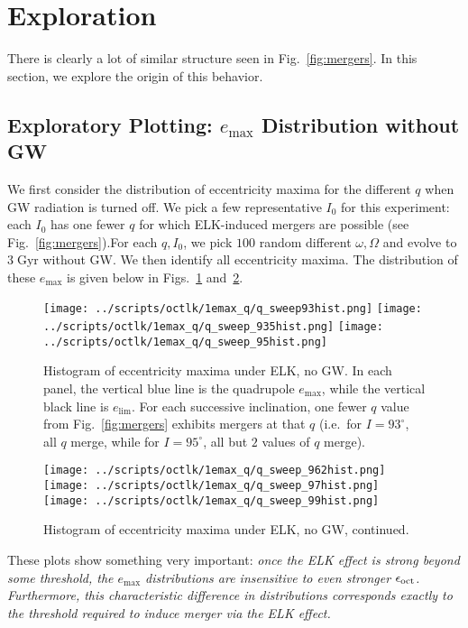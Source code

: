 \documentclass[11pt,
        usenames, %
        dvipsnames %
    ]{article}
\begin{document}
\section{Exploration}

There is clearly a lot of similar structure seen in Fig.~\ref{fig:mergers}. In
this section, we explore the origin of this behavior.

\subsection{Exploratory Plotting: $e_{\max}$ Distribution without GW}

We first consider the distribution of eccentricity maxima for the different $q$
when GW radiation is turned off. We pick a few representative $I_0$ for this
experiment: each $I_0$ has one fewer $q$ for which ELK-induced mergers are
possible (see Fig.~\ref{fig:mergers}).For each $q, I_0$, we pick $100$ random
different $\omega, \Omega$ and evolve to $3\;\mathrm{Gyr}$ without GW\@. We then
identify all eccentricity maxima. The distribution of these $e_{\max}$ is
given below in Figs.~\ref{fig:hists} and~\ref{fig:hists2}.
\begin{figure}
    \centering
    \texttt{[image: ../scripts/octlk/1emax\_q/q\_sweep93hist.png]}
    \texttt{[image: ../scripts/octlk/1emax\_q/q\_sweep\_935hist.png]}
    \texttt{[image: ../scripts/octlk/1emax\_q/q\_sweep\_95hist.png]}
    \caption{Histogram of eccentricity maxima under ELK, no GW\@. In each panel,
    the vertical blue line is the quadrupole $e_{\max}$, while the vertical
    black line is $e_{\lim}$. For each successive inclination, one fewer $q$
    value from Fig.~\ref{fig:mergers} exhibits mergers at that $q$ (i.e.\ for $I
    = 93^\circ$, all $q$ merge, while for $I = 95^\circ$, all but $2$ values of
    $q$ merge).}\label{fig:hists}
\end{figure}
\begin{figure}
    \centering
    \texttt{[image: ../scripts/octlk/1emax\_q/q\_sweep\_962hist.png]}
    \texttt{[image: ../scripts/octlk/1emax\_q/q\_sweep\_97hist.png]}
    \texttt{[image: ../scripts/octlk/1emax\_q/q\_sweep\_99hist.png]}
    \caption{Histogram of eccentricity maxima under ELK, no GW,
    continued.}\label{fig:hists2}
\end{figure}

These plots show something very important: \emph{once the ELK effect is
strong beyond some threshold, the $e_{\max}$ distributions are insensitive to
even stronger $\epsilon_{\rm oct}$. Furthermore, this characteristic difference
in distributions corresponds exactly to the threshold required to induce merger
via the ELK effect.}
\end{document}
